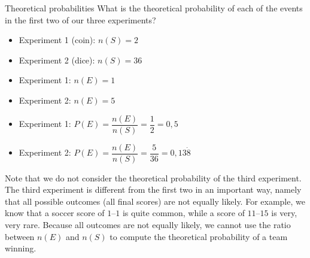 \begin{wex}{Theoretical probabilities}
{What is the theoretical probability of each of the events in the
  first two of our three experiments?}
{

  \begin{itemize}
  \item[] Experiment 1 (coin): $n(S) = 2$
  \item[] Experiment 2 (dice): $n(S) = 36$
  \end{itemize}
  

  \begin{itemize}
  \item[] Experiment 1: $n(E) = 1$
  \item[] Experiment 2: $n(E) = 5$
  \end{itemize}


  \begin{itemize}
  \item[] Experiment 1: $P(E) = \dfrac{n(E)}{n(S)} = \dfrac{1}{2} = 0,5$
  \item[] Experiment 2: $P(E) = \dfrac{n(E)}{n(S)} = \dfrac{5}{36} = 0,13\dot{8}$
  \end{itemize}
}
\end{wex}

Note that we do not consider the theoretical probability of the third
experiment. The third experiment is different from the first two in an
important way, namely that all possible outcomes (all final scores)
are not equally likely. For example, we know that a soccer score of
$1$--$1$ is quite common, while a score of $11$--$15$ is very, very
rare. Because all outcomes are not equally likely, we cannot use the
ratio between \(n(E)\) and \(n(S)\) to compute the theoretical
probability of a team winning. 


